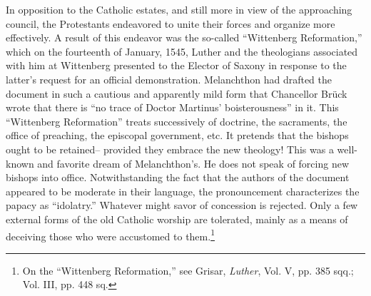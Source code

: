 In opposition to the Catholic estates, and still more in view of the
approaching council, the Protestants endeavored to unite their forces
and organize more effectively. A result of this endeavor was the so-called
“Wittenberg Reformation,” which on the fourteenth of January,
1545, Luther and the theologians associated with him at Wittenberg presented
to the Elector of Saxony in response to the latter’s
request for an official demonstration. Melanchthon had drafted the
document in such a cautious and apparently mild form that Chancellor Brück
wrote that there is “no trace of Doctor Martinus’ boisterousness” in it.
This “Wittenberg Reformation'' treats successively
of doctrine, the sacraments, the office of preaching, the episcopal government,
etc. It pretends that the bishops ought to be retained--
provided they embrace the new theology! This was a well-known and
favorite dream of Melanchthon’s. He does not speak of forcing new
bishops into office. Notwithstanding the fact that the authors of the
document appeared to be moderate in their language, the pronouncement
characterizes the papacy as “idolatry.” Whatever might savor
of concession is rejected. Only a few external forms of the old Catholic
worship are tolerated, mainly as a means of deceiving those who
were accustomed to them.\footnote
{On the “Wittenberg Reformation,” see Grisar, \textit{Luther}, Vol. V, pp. 385 sqq.; Vol. III,
pp. 448 sq.}
